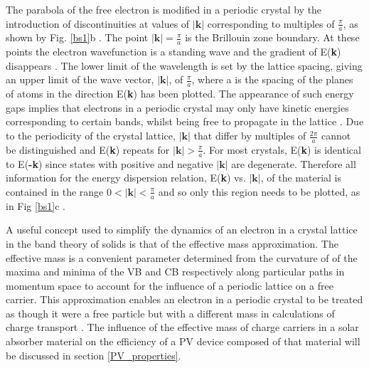 \documentclass[11pt, twoside]{report}
\begin{document}
The parabola of the free electron is modified in a periodic crystal by the introduction of discontinuities at values of $|\textbf{k}|$ corresponding to multiples of $\frac{\pi}{a}$, as shown by Fig. \ref{bs1}b \cite{small_semiconductor2}. The point $|\textbf{k}| = \frac{\pi}{a}$ is the Brillouin zone boundary. At these points the electron wavefunction is a standing wave and the gradient of E(\textbf{k}) disappears \cite{Nelson3}.
The lower limit of the wavelength is set by the lattice spacing, giving an upper limit of the wave vector, $|\textbf{k}|$, of $\frac{\pi}{a}$, where a is the spacing of the planes of atoms in the direction E(\textbf{k}) has been plotted.  The appearance of such energy gaps implies that electrons in a periodic crystal may only have kinetic energies corresponding to certain bands, whilst being free to propagate in the lattice \cite{small_semiconductor2}.
Due to the periodicity of the crystal lattice, $|\textbf{k}|$  that differ by multiples of $\frac{2\pi}{a}$ cannot be distinguished and E(\textbf{k}) repeats for $|\textbf{k}| > \frac{\pi}{a}$. For most crystals, E(\textbf{k}) is identical to E(\textbf{-k}) since states with positive and negative $|\textbf{k}|$ are degenerate. Therefore all information for the energy dispersion relation, E(\textbf{k}) vs. $|\textbf{k}|$, of the material is contained in the range $0 < |\textbf{k}| < \frac{\pi}{a}$ and so only this region needs to be plotted, as in Fig \ref{bs1}c \cite{Nelson3}. 

A useful concept used to simplify the dynamics of an electron in a crystal lattice in the band theory of solids is that of the effective mass approximation. The effective mass is a convenient parameter determined from the curvature of of the maxima and minima of the VB and CB respectively along particular paths in momentum space to account for the influence of a periodic lattice on a free carrier. This approximation enables an electron in a periodic crystal to be treated as though it were a free particle but with a different mass in calculations of charge transport \cite{small_semiconductor2}.
The influence of the effective mass of charge carriers in a solar absorber material on the efficiency of a PV device composed of that material will be discussed in section \ref{PV_properties}.
\end{document}
